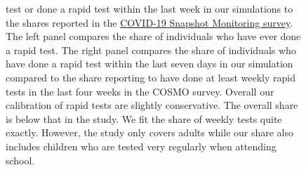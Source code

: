 \begin{figure}[ht]
{        test or done a rapid test within the last week in our simulations to the shares
        reported in the
        \href{https://projekte.uni-erfurt.de/cosmo2020/web/topic/wissen-verhalten/80-schnelltests/}{COVID-19
            Snapshot Monitoring survey}. The left panel compares the share of individuals
        who have ever done a rapid test. The right panel compares the share of
        individuals who have done a rapid test within the last seven days in our
        simulation compared to the share reporting to have done at least weekly rapid
        tests in the last four weeks in the COSMO survey. Overall our calibration of
        rapid tests are slightly conservative. The overall share is below that in the
        study. We fit the share of weekly tests quite exactly. However, the study only
        covers adults while our share also includes children who are tested very
        regularly when attending school.}
\end{figure}
